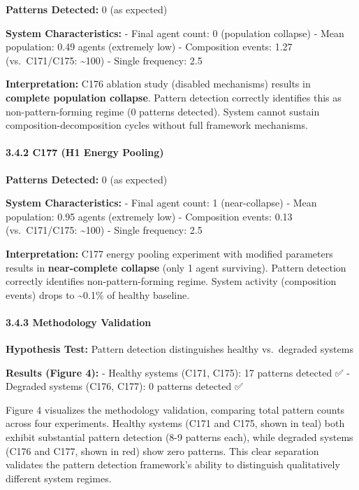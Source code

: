 \documentclass[
]{article}
\begin{document}
\textbf{Patterns Detected:} 0 (as expected)

\textbf{System Characteristics:} - Final agent count: 0 (population
collapse) - Mean population: 0.49 agents (extremely low) - Composition
events: 1.27 (vs.~C171/C175: \textasciitilde100) - Single frequency: 2.5

\textbf{Interpretation:} C176 ablation study (disabled mechanisms)
results in \textbf{complete population collapse}. Pattern detection
correctly identifies this as non-pattern-forming regime (0 patterns
detected). System cannot sustain composition-decomposition cycles
without full framework mechanisms.

\paragraph{3.4.2 C177 (H1 Energy Pooling)}\label{c177-h1-energy-pooling}

\textbf{Patterns Detected:} 0 (as expected)

\textbf{System Characteristics:} - Final agent count: 1 (near-collapse)
- Mean population: 0.95 agents (extremely low) - Composition events:
0.13 (vs.~C171/C175: \textasciitilde100) - Single frequency: 2.5

\textbf{Interpretation:} C177 energy pooling experiment with modified
parameters results in \textbf{near-complete collapse} (only 1 agent
surviving). Pattern detection correctly identifies non-pattern-forming
regime. System activity (composition events) drops to
\textasciitilde0.1\% of healthy baseline.

\paragraph{3.4.3 Methodology Validation}\label{methodology-validation-1}

\textbf{Hypothesis Test:} Pattern detection distinguishes healthy
vs.~degraded systems

\textbf{Results (Figure 4):} - Healthy systems (C171, C175): 17 patterns
detected ✅ - Degraded systems (C176, C177): 0 patterns detected ✅

Figure 4 visualizes the methodology validation, comparing total pattern
counts across four experiments. Healthy systems (C171 and C175, shown in
teal) both exhibit substantial pattern detection (8-9 patterns each),
while degraded systems (C176 and C177, shown in red) show zero patterns.
This clear separation validates the pattern detection framework's
ability to distinguish qualitatively different system regimes.
\end{document}
